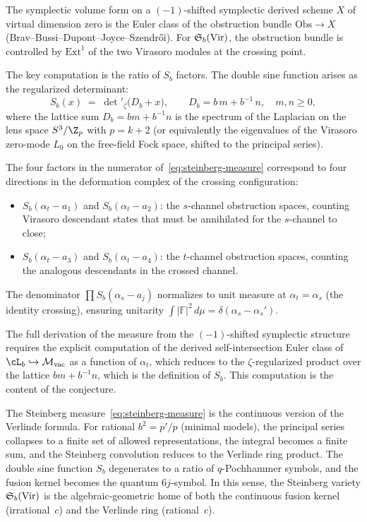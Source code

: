 \begin{remark}[Evidence]
The symplectic volume form on a $(-1)$-shifted symplectic derived
scheme $X$ of virtual dimension zero is the Euler class of the
obstruction bundle $\mathrm{Obs} \to X$
(Brav--Bussi--Dupont--Joyce--Szendr\H{o}i). For
$\mathfrak{S}_b(\mathrm{Vir})$, the obstruction bundle is
controlled by $\mathrm{Ext}^1$ of the two Virasoro modules at
the crossing point.

The key computation is the ratio of $S_b$ factors. The double
sine function arises as the regularized determinant:
\[
S_b(x) \;=\; \det\nolimits'_\zeta
\bigl(D_b + x\bigr),
\qquad
D_b = b\,m + b^{-1}\,n,\quad m,n \ge 0,
\]
where the lattice sum $D_b = bm + b^{-1}n$ is the spectrum of the
Laplacian on the lens space $S^3/\Z_p$ with $p = k+2$ (or
equivalently the eigenvalues of the Virasoro zero-mode $L_0$ on
the free-field Fock space, shifted to the principal series).

The four factors in the numerator of~\eqref{eq:steinberg-measure}
correspond to four directions in the deformation complex of the
crossing configuration:
\begin{itemize}
\item $S_b(\alpha_t - a_1)$ and $S_b(\alpha_t - a_2)$: the
 $s$-channel obstruction spaces, counting Virasoro descendant
 states that must be annihilated for the $s$-channel to close;
\item $S_b(\alpha_t - a_3)$ and $S_b(\alpha_t - a_4)$: the
 $t$-channel obstruction spaces, counting the analogous
 descendants in the crossed channel.
\end{itemize}
The denominator $\prod S_b(\alpha_s - a_j)$ normalizes to unit
measure at $\alpha_t = \alpha_s$ (the identity crossing), ensuring
unitarity $\int |\mathbb{F}|^2\,d\mu = \delta(\alpha_s -
\alpha_s')$.

The full derivation of the measure from the
$(-1)$-shifted symplectic structure requires the explicit
computation of the derived self-intersection Euler class of $\cL_b
\hookrightarrow \Mvac$ as a function of $\alpha_t$, which
reduces to the $\zeta$-regularized product
over the lattice $bm + b^{-1}n$, which is the definition of
$S_b$. This computation is the content of the conjecture.
\end{remark}

\begin{remark}
\label{rem:verlinde-steinberg}
The Steinberg measure~\eqref{eq:steinberg-measure} is the
continuous version of the Verlinde formula. For rational $b^2 =
p'/p$ (minimal models), the principal series collapses to a finite
set of allowed representations, the integral becomes a finite sum,
and the Steinberg convolution reduces to the Verlinde ring product.
The double sine function $S_b$ degenerates to a ratio of $q$-Pochhammer
symbols, and the fusion kernel becomes the quantum $6j$-symbol. In
this sense, the Steinberg variety $\mathfrak{S}_b(\mathrm{Vir})$ is
the algebraic-geometric home of both the continuous fusion kernel
(irrational~$c$) and the Verlinde ring (rational~$c$).
\end{remark}

